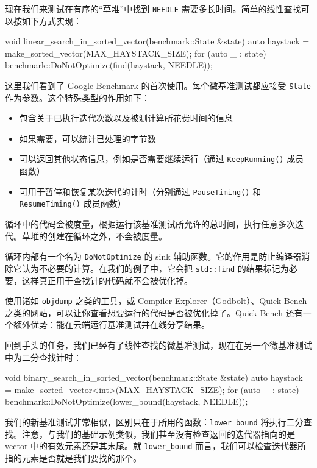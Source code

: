 现在我们来测试在有序的“草堆”中找到 \texttt{NEEDLE} 需要多长时间。简单的线性查找可以按如下方式实现：

\begin{codebox}[text]
void linear_search_in_sorted_vector(benchmark::State &state) {
  auto haystack = make_sorted_vector(MAX_HAYSTACK_SIZE);
  for (auto _ : state) {
    benchmark::DoNotOptimize(find(haystack, NEEDLE));
  }
}
\end{codebox}

这里我们看到了 Google Benchmark 的首次使用。每个微基准测试都应接受 \texttt{State} 作为参数。这个特殊类型的作用如下：

\begin{itemize}
\item 包含关于已执行迭代次数以及被测计算所花费时间的信息
\item 如果需要，可以统计已处理的字节数
\item 可以返回其他状态信息，例如是否需要继续运行（通过 \texttt{Keep\allowbreak{}Running(\allowbreak{})\allowbreak{}} 成员函数）
\item 可用于暂停和恢复某次迭代的计时（分别通过 \texttt{Pause\allowbreak{}Timing(\allowbreak{})\allowbreak{}} 和 \texttt{Resume\allowbreak{}Timing(\allowbreak{})\allowbreak{}} 成员函数）
\end{itemize}

\label{idx:1166}
循环中的代码会被度量，根据运行该基准测试所允许的总时间，执行任意多次迭代。草堆的创建在循环之外，不会被度量。

循环内部有一个名为 \texttt{Do\allowbreak{}Not\allowbreak{}Optimize} 的 sink 辅助函数。它的作用是防止编译器消除它认为不必要的计算。在我们的例子中，它会把 \texttt{std::find} 的结果标记为必要，这样真正用于查找针的代码就不会被优化掉。

使用诸如 \texttt{objdump} 之类的工具，或 Compiler Explorer（Godbolt）、Quick Bench 之类的网站，可以让你查看想要运行的代码是否被优化掉了。Quick Bench 还有一个额外优势：能在云端运行基准测试并在线分享结果。

回到手头的任务，我们已经有了线性查找的微基准测试，现在在另一个微基准测试中为二分查找计时：

\begin{codebox}[text]
void binary_search_in_sorted_vector(benchmark::State &state) {
  auto haystack = make_sorted_vector<int>(MAX_HAYSTACK_SIZE);
  for (auto _ : state) {
    benchmark::DoNotOptimize(lower_bound(haystack, NEEDLE));
  }
}
\end{codebox}

我们的新基准测试非常相似，区别只在于所用的函数：\texttt{lower\_\allowbreak{}bound} 将执行二分查找。注意，与我们的基础示例类似，我们甚至没有检查返回的迭代器指向的是 vector 中的有效元素还是其末尾。就 \texttt{lower\_\allowbreak{}bound} 而言，我们可以检查迭代器所指的元素是否就是我们要找的那个。

